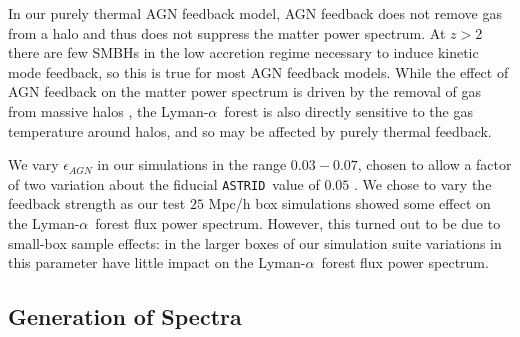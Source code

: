\documentclass[a4paper,11pt]{article}
\newcommand{\Lya}{Lyman-$\alpha$}
\newcommand{\astrid}{\texttt{ASTRID}}
\begin{document}
In our purely thermal AGN feedback model, AGN feedback does not remove gas from a halo and thus does not suppress the matter power spectrum. At $z > 2$ there are few SMBHs in the low accretion regime necessary to induce kinetic mode feedback, so this is true for most AGN feedback models. While the effect of AGN feedback on the matter power spectrum is driven by the removal of gas from massive halos \cite[e.g.~][]{Giri:2021}, the \Lya~forest is also directly sensitive to the gas temperature around halos, and so may be affected by purely thermal feedback.

We vary $\epsilon_{AGN}$ in our simulations in the range $0.03 - 0.07$, chosen to allow a factor of two variation about the fiducial \astrid~value of $0.05$ \cite{Ni:2022}. We chose to vary the feedback strength as our test $25$ Mpc/h box simulations showed some effect on the \Lya~forest flux power spectrum. However, this turned out to be due to small-box sample effects: in the larger boxes of our simulation suite variations in this parameter have little impact on the \Lya~forest flux power spectrum.


\subsection{Generation of Spectra}
\label{sec:spectra}
\end{document}

